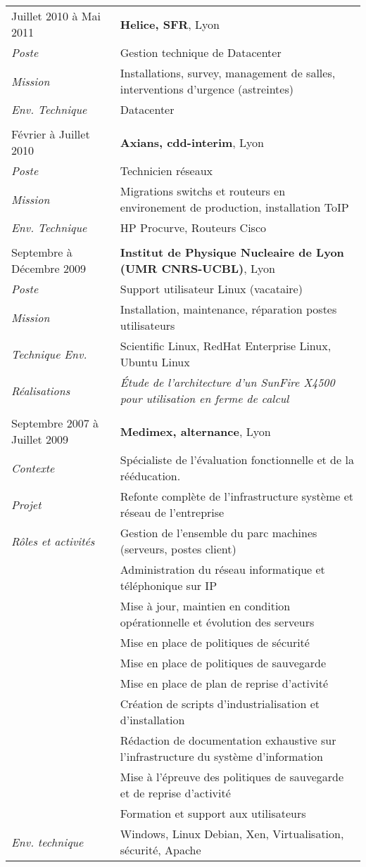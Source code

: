 \documentclass[a4paper,8pt]{article}
\begin{document}
\begin{tabular}{P{3.5cm}|p{13cm}}
Juillet 2010 à Mai 2011	& \textbf{Helice, SFR}, Lyon\\
\textsl{Poste}			& Gestion technique de Datacenter\\
\textsl{Mission}		& Installations, survey, management de salles, interventions d'urgence (astreintes)\\
\textsl{Env. Technique}	& Datacenter\\
 & \\
Février à Juillet 2010	& \textbf{Axians, cdd-interim}, Lyon\\
\textsl{Poste}	 		& Technicien réseaux\\
\textsl{Mission}		& Migrations switchs et routeurs en environement de production, installation ToIP\\
\textsl{Env. Technique}	& HP Procurve, Routeurs Cisco\\
 & \\
Septembre à Décembre 2009		& \textbf{Institut de Physique Nucleaire de Lyon (UMR CNRS-UCBL)}, Lyon\\
\textsl{Poste}	 		& Support utilisateur Linux (vacataire)\\
\textsl{Mission} 		& Installation, maintenance, réparation postes utilisateurs\\
\textsl{Technique Env.}	& Scientific Linux, RedHat Enterprise Linux, Ubuntu Linux\\
\textsl{Réalisations}	& \textsl{\'{E}tude de l'architecture d'un SunFire X4500 pour utilisation en ferme de calcul}\\
 & \\
Septembre 2007 à Juillet 2009	& \textbf{Medimex, alternance}, Lyon\\
\textsl{Contexte}			& Spécialiste de l’évaluation fonctionnelle et de la rééducation.\\
\textsl{Projet}				& Refonte complète de l'infrastructure système et réseau de l'entreprise\\
\textsl{Rôles et activités} & Gestion de l'ensemble du parc machines (serveurs, postes client)\\
							& Administration du réseau informatique et téléphonique sur IP\\
							& Mise à jour, maintien en condition opérationnelle et évolution des serveurs\\
							& Mise en place de politiques de sécurité\\
							& Mise en place de politiques de sauvegarde\\
							& Mise en place de plan de reprise d'activité\\
							& Création de scripts d'industrialisation et d'installation\\
							& Rédaction de documentation exhaustive sur l'infrastructure du système d'information\\
							& Mise à l'épreuve des politiques de sauvegarde et de reprise d'activité\\
							& Formation et support aux utilisateurs\\
\textsl{Env. technique}		& Windows, Linux Debian, Xen, Virtualisation, sécurité, Apache\\
\end{tabular}
\end{document}

